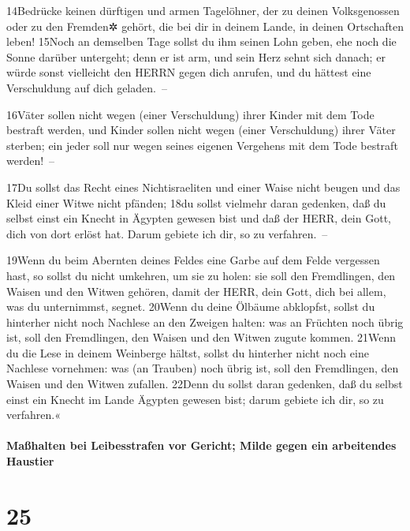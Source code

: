 14Bedrücke keinen dürftigen und armen Tagelöhner, der zu deinen
Volksgenossen oder zu den Fremden✲ gehört, die bei dir in deinem Lande,
in deinen Ortschaften leben! 15Noch an demselben Tage sollst du ihm
seinen Lohn geben, ehe noch die Sonne darüber untergeht; denn er ist
arm, und sein Herz sehnt sich danach; er würde sonst vielleicht den
HERRN gegen dich anrufen, und du hättest eine Verschuldung auf dich
geladen.~--

16Väter sollen nicht wegen (einer Verschuldung) ihrer Kinder mit dem
Tode bestraft werden, und Kinder sollen nicht wegen (einer Verschuldung)
ihrer Väter sterben; ein jeder soll nur wegen seines eigenen Vergehens
mit dem Tode bestraft werden!~--

17Du sollst das Recht eines Nichtisraeliten und einer Waise nicht beugen
und das Kleid einer Witwe nicht pfänden; 18du sollst vielmehr daran
gedenken, daß du selbst einst ein Knecht in Ägypten gewesen bist und daß
der HERR, dein Gott, dich von dort erlöst hat. Darum gebiete ich dir, so
zu verfahren.~--

19Wenn du beim Abernten deines Feldes eine Garbe auf dem Felde vergessen
hast, so sollst du nicht umkehren, um sie zu holen: sie soll den
Fremdlingen, den Waisen und den Witwen gehören, damit der HERR, dein
Gott, dich bei allem, was du unternimmst, segnet. 20Wenn du deine
Ölbäume abklopfst, sollst du hinterher nicht noch Nachlese an den
Zweigen halten: was an Früchten noch übrig ist, soll den Fremdlingen,
den Waisen und den Witwen zugute kommen. 21Wenn du die Lese in deinem
Weinberge hältst, sollst du hinterher nicht noch eine Nachlese
vornehmen: was (an Trauben) noch übrig ist, soll den Fremdlingen, den
Waisen und den Witwen zufallen. 22Denn du sollst daran gedenken, daß du
selbst einst ein Knecht im Lande Ägypten gewesen bist; darum gebiete ich
dir, so zu verfahren.«

\hypertarget{mauxdfhalten-bei-leibesstrafen-vor-gericht-milde-gegen-ein-arbeitendes-haustier}{%
\paragraph{Maßhalten bei Leibesstrafen vor Gericht; Milde gegen ein
arbeitendes
Haustier}\label{mauxdfhalten-bei-leibesstrafen-vor-gericht-milde-gegen-ein-arbeitendes-haustier}}

\hypertarget{section-24}{%
\section{25}\label{section-24}}

